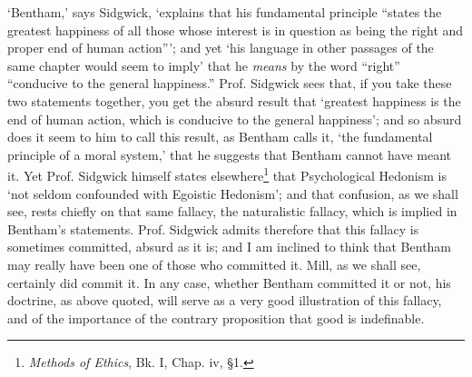 `Bentham,' says Sidgwick, `explains that his fundamental principle
``states the greatest happiness of all those whose interest is in
question as being the right and proper end of human action'''; and yet
`his language in other passages of the same chapter would seem to
imply' that he \textit{means} by the word ``right'' ``conducive to the
general happiness.'' Prof. Sidgwick sees that, if you take these two
statements together, you get the absurd result that `greatest
happiness is the end of human action, which is conducive to the
general happiness'; and so absurd does it seem to him to call this
result, as Bentham calls it, `the fundamental principle of a moral
system,' that he suggests that Bentham cannot have meant it. Yet Prof.
Sidgwick  himself states elsewhere\footnote{\textit{Methods
of Ethics}, Bk. I, Chap. iv, \S1.} that Psychological Hedonism is `not
seldom confounded with Egoistic Hedonism'; and that confusion, as we
shall see, rests chiefly on that same fallacy, the naturalistic
fallacy, which is implied in Bentham's statements. Prof. Sidgwick
admits therefore that this fallacy is sometimes committed, absurd as
it is; and I am inclined to think that Bentham may really have been
one of those who committed it. Mill, as we shall see, certainly did
commit it. In any case, whether Bentham committed it or not, his
doctrine, as above quoted, will serve as a very good illustration of
this fallacy, and of the importance of the contrary proposition that
good is indefinable.

